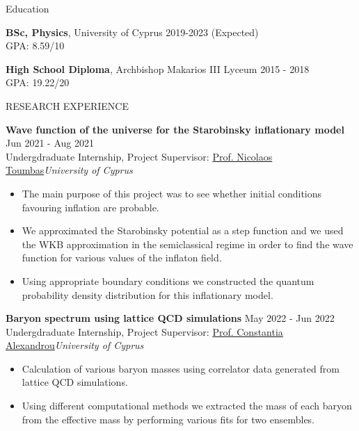 \documentclass{resume} %
\begin{document}
\begin{rSection}{Education}

{\bf BSc, Physics}, University of Cyprus \hfill {2019-2023 (Expected)}\\
GPA: 8.59/10

{\bf High School Diploma}, Archbishop Makarios III Lyceum \hfill {2015 - 2018}\\
GPA: 19.22/20


\end{rSection}


\begin{rSection}{RESEARCH EXPERIENCE}

\textbf{Wave function of the universe for the Starobinsky inflationary model} \hfill Jun 2021 - Aug 2021\\
Undergdraduate Internship, Project Supervisor:  \href{https://ucyweb.ucy.ac.cy/dir/en/component/comprofiler/userprofile/nick}{Prof. Nicolaos Toumbas}\hfill \textit{University of Cyprus}
 \begin{itemize}
    \itemsep -3pt {} 
     \item The main purpose of this project was to see whether initial conditions favouring inflation are probable.
     \item We approximated the Starobinsky potential as a step function and we used the WKB approximation in the semiclassical regime in order to find the wave function for various values of the inflaton field.
    \item Using appropriate boundary conditions we constructed the quantum probability density distribution for this inflationary model.
 \end{itemize}
 
\textbf{Baryon spectrum using lattice QCD simulations} \hfill May 2022 - Jun 2022\\
Undergdraduate Internship, Project Supervisor:  \href{https://www.cyi.ac.cy/index.php/castorc/about-the-center/castorc-our-people/itemlist/user/99-constantia-alexandrou.html}{Prof. Constantia Alexandrou}\hfill \textit{University of Cyprus}
 \begin{itemize}
    \itemsep -3pt {} 
     \item Calculation of various baryon masses using correlator data generated from lattice QCD simulations.
     \item Using different computational methods we extracted the mass of each baryon from the effective mass by performing various fits for two ensembles.
 \end{itemize}


\end{rSection}
\end{document}
